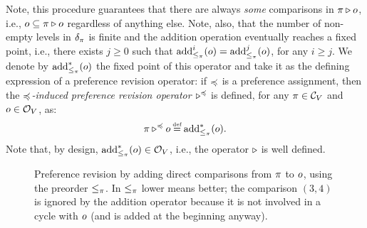 Note, this procedure guarantees that there are always \emph{some} comparisons in $\pi\triangleright o$, i.e.,
$o\subseteq\pi\triangleright o$ regardless of anything else.
Note, also, that the number of non-empty levels in $\delta_\pi$ is finite and
the addition operation eventually reaches a fixed point, i.e., there exists $j\ge 0$ such that
${\operatorname{add}}^i_{\le_\pi}(o)={\operatorname{add}}^j_{\le_\pi}(o)$, for any $i\ge j$.
We denote by ${\operatorname{add}}_{\le_\pi}^\ast(o)$ the fixed point of this operator and take it as the defining expression of
a preference revision operator: if $\preccurlyeq$ is a preference assignment,
then the \emph{$\preccurlyeq$-induced preference revision operator $\triangleright^\preccurlyeq$} 
is defined, for any $\pi\in\mathcal{C}_V$
and $o\in\mathcal{O}_V$, as:
$$
	\p\en^\as\o\defeq\add^\ast_{\le_\p}(\o).
$$
Note that, by design, ${\operatorname{add}}^\ast_{\le_\pi}(o)\in\mathcal{O}_V$, i.e., the operator $\triangleright$ is well defined.

\begin{figure}\centering
	\caption{
		Preference revision by adding direct comparisons from $\pi$ to $o$, using the preorder $\le_\pi$.
		In $\le_\pi$ lower means better; the comparison $(3,4)$ is ignored by the addition operator because it
		is not involved in a cycle with $o$ (and is added at the beginning anyway).
	}
	\label{fig:7-preferences-4-items}
\end{figure}

